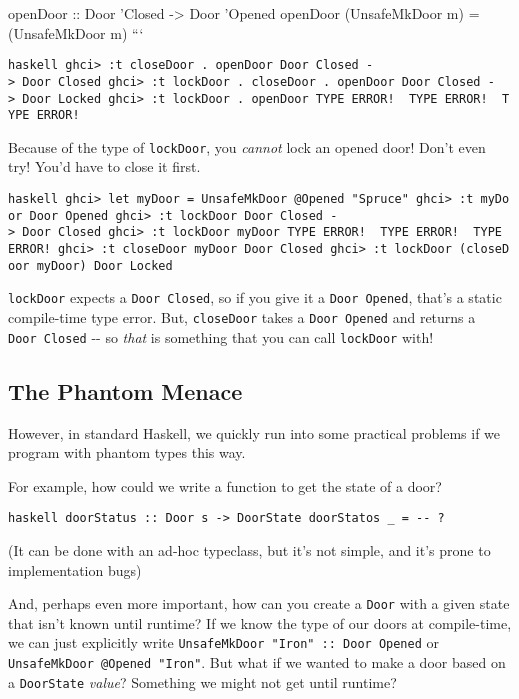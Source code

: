\documentclass[]{article}
\begin{document}
openDoor :: Door 'Closed -\textgreater{} Door 'Opened openDoor (UnsafeMkDoor m)
= (UnsafeMkDoor m) ```

\texttt{haskell\ ghci\textgreater{}\ :t\ closeDoor\ .\ openDoor\ Door\ \textquotesingle{}Closed\ -\textgreater{}\ Door\ \textquotesingle{}Closed\ ghci\textgreater{}\ :t\ lockDoor\ .\ closeDoor\ .\ openDoor\ Door\ \textquotesingle{}Closed\ -\textgreater{}\ Door\ \textquotesingle{}Locked\ ghci\textgreater{}\ :t\ lockDoor\ .\ openDoor\ TYPE\ ERROR!\ \ TYPE\ ERROR!\ \ TYPE\ ERROR!}

Because of the type of \texttt{lockDoor}, you \emph{cannot} lock an opened door!
Don't even try! You'd have to close it first.

\texttt{haskell\ ghci\textgreater{}\ let\ myDoor\ =\ UnsafeMkDoor\ @\textquotesingle{}Opened\ "Spruce"\ ghci\textgreater{}\ :t\ myDoor\ Door\ \textquotesingle{}Opened\ ghci\textgreater{}\ :t\ lockDoor\ Door\ \textquotesingle{}Closed\ -\textgreater{}\ Door\ \textquotesingle{}Closed\ ghci\textgreater{}\ :t\ lockDoor\ myDoor\ TYPE\ ERROR!\ \ TYPE\ ERROR!\ \ TYPE\ ERROR!\ ghci\textgreater{}\ :t\ closeDoor\ myDoor\ Door\ \textquotesingle{}Closed\ ghci\textgreater{}\ :t\ lockDoor\ (closeDoor\ myDoor)\ Door\ \textquotesingle{}Locked}

\texttt{lockDoor} expects a \texttt{Door\ \textquotesingle{}Closed}, so if you
give it a \texttt{Door\ \textquotesingle{}Opened}, that's a static compile-time
type error. But, \texttt{closeDoor} takes a
\texttt{Door\ \textquotesingle{}Opened} and returns a
\texttt{Door\ \textquotesingle{}Closed} -\/- so \emph{that} is something that
you can call \texttt{lockDoor} with!

\subsection{The Phantom Menace}

However, in standard Haskell, we quickly run into some practical problems if we
program with phantom types this way.

For example, how could we write a function to get the state of a door?

\texttt{haskell\ doorStatus\ ::\ Door\ s\ -\textgreater{}\ DoorState\ doorStatos\ \_\ =\ -\/-\ ?}

(It can be done with an ad-hoc typeclass, but it's not simple, and it's prone to
implementation bugs)

And, perhaps even more important, how can you create a \texttt{Door} with a
given state that isn't known until runtime? If we know the type of our doors at
compile-time, we can just explicitly write
\texttt{UnsafeMkDoor\ "Iron"\ ::\ Door\ \textquotesingle{}Opened} or
\texttt{UnsafeMkDoor\ @\textquotesingle{}Opened\ "Iron"}. But what if we wanted
to make a door based on a \texttt{DoorState} \emph{value}? Something we might
not get until runtime?
\end{document}
